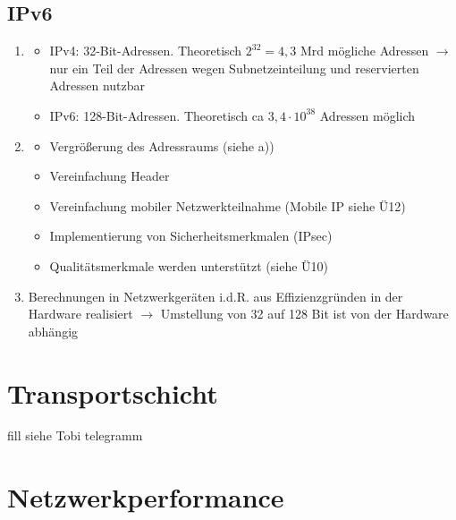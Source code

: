 \subsection{IPv6}
\begin{enumerate}
	\item 
	\begin{itemize}
		\item IPv4: 32-Bit-Adressen. Theoretisch $2^{32} = 4,3$ Mrd mögliche Adressen $\to$ nur ein Teil der Adressen wegen Subnetzeinteilung und reservierten Adressen nutzbar
	 	\item IPv6: 128-Bit-Adressen. Theoretisch ca $3,4 \cdot 10^{38}$ Adressen möglich
	 \end{itemize}
	 \item
	 \begin{itemize}
	 	\item Vergrößerung des Adressraums (siehe a))
	 	\item Vereinfachung Header
	 	\item Vereinfachung mobiler Netzwerkteilnahme (Mobile IP siehe Ü12)
	 	\item Implementierung von Sicherheitsmerkmalen (IPsec)
	 	\item Qualitätsmerkmale werden unterstützt (siehe Ü10)
	 \end{itemize}
	 \item Berechnungen in Netzwerkgeräten i.d.R. aus Effizienzgründen in der Hardware realisiert $\to$ Umstellung von 32 auf 128 Bit ist von der Hardware abhängig
\end{enumerate}
\section{Transportschicht}
fill siehe Tobi telegramm
\section{Netzwerkperformance}
